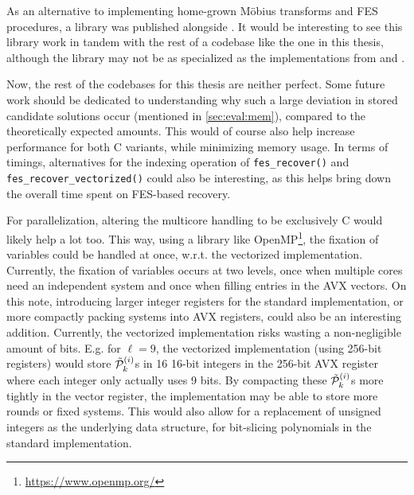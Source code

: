 As an alternative to implementing home-grown Möbius transforms and FES procedures, a library was published alongside \cite{cryptoeprint:2022/1412}. It would be interesting to see this library work in tandem with the rest of a codebase like the one in this thesis, although the library may not be as specialized as the implementations from \cite{ches-2010-23990} and \cite{cryptoeprint:2013/436}.

Now, the rest of the codebases for this thesis are neither perfect. Some future work should be dedicated to understanding why such a large deviation in stored candidate solutions occur (mentioned in \cref{sec:eval:mem}), compared to the theoretically expected amounts. This would of course also help increase performance for both C variants, while minimizing memory usage. In terms of timings, alternatives for the indexing operation of \texttt{fes\_recover()} and \texttt{fes\_recover\_vectorized()} could also be interesting, as this helps bring down the overall time spent on FES-based recovery. 

For parallelization, altering the multicore handling to be exclusively C would likely help a lot too. This way, using a library like OpenMP\footnote{\url{https://www.openmp.org/}}, the fixation of variables could be handled at once, w.r.t. the vectorized implementation. Currently, the fixation of variables occurs at two levels, once when multiple cores need an independent system and once when filling entries in the AVX vectors. On this note, introducing larger integer registers for the standard implementation, or more compactly packing systems into AVX registers, could also be an interesting addition. Currently, the vectorized implementation risks wasting a non-negligible amount of bits. E.g. for $\ell = 9$, the vectorized implementation (using 256-bit registers) would store $\Tilde{\mathcal{P}}^{(i)}_k$s in 16 16-bit integers in the 256-bit AVX register where each integer only actually uses 9 bits. By compacting these $\Tilde{\mathcal{P}}^{(i)}_k$s more tightly in the vector register, the implementation may be able to store more rounds or fixed systems. This would also allow for a replacement of unsigned integers as the underlying data structure, for bit-slicing polynomials in the standard implementation.